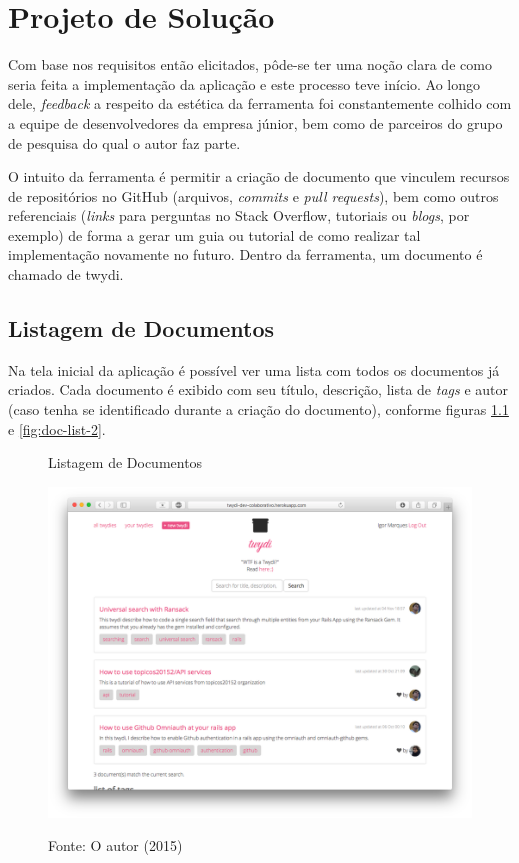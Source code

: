 \chapter{Projeto de Solução}

Com base nos requisitos então elicitados, pôde-se ter uma noção clara de como seria feita a implementação da aplicação e este processo teve início. Ao longo dele, \textit{feedback} a respeito da estética da ferramenta foi constantemente colhido com a equipe de desenvolvedores da empresa júnior, bem como de parceiros do grupo de pesquisa do qual o autor faz parte.

O intuito da ferramenta é permitir a criação de documento que vinculem recursos de repositórios no GitHub (arquivos, \textit{commits} e \textit{pull requests}), bem como outros referenciais (\textit{links} para perguntas no Stack Overflow, tutoriais ou \textit{blogs}, por exemplo) de forma a gerar um guia ou tutorial de como realizar tal implementação novamente no futuro. Dentro da ferramenta, um documento é chamado de twydi.

\section{Listagem de Documentos}

Na tela inicial da aplicação é possível ver uma lista com todos os documentos já criados. Cada documento é exibido com seu título, descrição, lista de \textit{tags} e autor (caso tenha se identificado durante a criação do documento), conforme figuras \ref{fig:doc-list-1} e \ref{fig:doc-list-2}.

\begin{figure}[h]
	\centering
    \caption{Listagem de Documentos}
    \includegraphics[width=15cm]{Imagens/print-lista-1.png}
		\label{fig:doc-list-1}
	\caption*{Fonte: O autor (2015)}
\end{figure}

